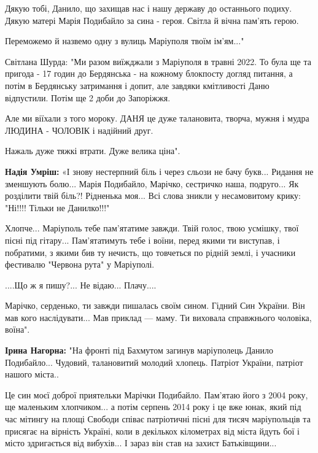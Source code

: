 Дякую тобі, Данило, що захищав нас і нашу державу до останнього подиху. Дякую
матері Марія Подибайло за сина - героя. Світла й вічна пам'ять герою.

Переможемо й назвемо одну з вулиць Маріуполя твоїм ім'ям..."


Світлана Шурда: "Ми разом виїжджали з Маріуполя в травні 2022. То була ще та
пригода - 17 годин до Бердянська - на кожному блокпосту догляд питання, а потім
в Бердянську затримання і допит, але завдяки кмітливості Даню відпустили. Потім
ще 2 доби до Запоріжжя.

Але ми віїхали з того мороку. ДАНЯ це дуже талановита, творча, мужня і мудра
ЛЮДИНА - ЧОЛОВІК і надійний друг. 

Нажаль дуже тяжкі втрати. Дуже велика ціна".


\textbf{Надія Умріш:} «І знову нестерпний біль і через сльози не бачу букв...
Ридання не зменшують болю... Марія Подибайло, Марічко, сестричко наша,
подруго... Як розділити твій біль?! Рідненька моя... Всі слова зникли у
несамовитому крику: "Ні!!!! Тільки не Данилко!!!"

Хлопче... Маріуполь тебе пам'ятатиме завжди. Твій голос, твою усмішку, твої
пісні під гітару... Пам'ятатимуть тебе і воїни, перед якими ти виступав, і
побратими, з якими бив ту нечисть, що товчеться по рідній землі, і учасники
фестивалю "Червона рута" у Маріуполі.

....Що ж я пишу?... Не відаю... Плачу....

Марічко, серденько, ти завжди пишалась своїм сином. Гідний Син України. Він
мав кого наслідувати... Мав приклад — маму. Ти виховала справжнього
чоловіка, воїна".


\textbf{Ірина Нагорна:} "На фронті під Бахмутом загинув маріуполець Данило
Подибайло... Чудовий, талановитий молодий хлопець. Патріот України, патріот
нашого міста..

Це син моєї доброї приятельки Марічки Подибайло. Пам'ятаю його з 2004 року, ще
маленьким хлопчиком... а потім серпень 2014 року і це вже юнак, який під час
мітингу на площі Свободи співає патріотичні пісні для тисяч маріупольців та
присягає на вірність Україні, коли в декількох кілометрах від міста йдуть бої і
місто здригається від вибухів... І зараз він став на захист Батьківщини...


